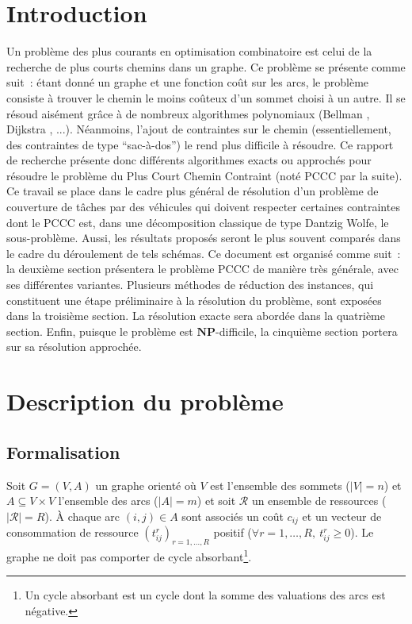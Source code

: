 \documentclass[10pt,francais]{llncs}
\begin{document}
\section{Introduction}\label{sec-intro}
Un probl\`eme des plus courants en optimisation combinatoire est celui de la recherche de plus courts chemins dans un graphe. Ce probl\`eme se pr\'esente comme suit~: \'etant donn\'e un graphe et une fonction co\^ut sur les arcs, le probl\`eme consiste \`a trouver le chemin le moins co\^uteux d'un sommet choisi \`a un autre. Il se r\'esoud ais\'ement gr\^ace \`a de nombreux algorithmes polynomiaux  (Bellman \cite{Bellman1958}, Dijkstra \cite{Dijkstra1959}, ...). N\'eanmoins, l'ajout de contraintes sur le chemin (essentiellement, des contraintes de type ``sac-\`a-dos'') le rend plus difficile \`a r\'esoudre. Ce rapport de recherche pr\'esente donc diff\'erents algorithmes exacts ou approch\'es pour r\'esoudre le probl\`eme du Plus Court Chemin Contraint (not\'e PCCC par la suite). Ce travail se place dans le cadre plus g\'en\'eral de r\'esolution d'un probl\`eme de couverture de t\^aches par des v\'ehicules qui doivent respecter certaines contraintes dont le PCCC est, dans une d\'ecomposition classique  de type Dantzig Wolfe, le sous-probl\`eme. Aussi, les r\'esultats propos\'es seront le plus souvent compar\'es dans le cadre du d\'eroulement de tels sch\'emas. 
Ce document est organis\'e comme suit~: la deuxi\`eme section pr\'esentera le probl\`eme PCCC de mani\`ere tr\`es g\'en\'erale, avec ses diff\'erentes variantes. Plusieurs m\'ethodes de r\'eduction des instances, qui constituent une \'etape pr\'eliminaire \`a la r\'esolution du probl\`eme, sont expos\'ees dans la troisi\`eme section. La r\'esolution exacte sera abord\'ee dans la quatri\`eme section. Enfin, puisque le probl\`eme est $\mathbf{NP}$-difficile, la cinqui\`eme section portera sur sa r\'esolution approch\'ee.

\section{Description du probl\`eme}\label{sec-desc}
\subsection{Formalisation}\label{sub-desc-form} 
Soit $G=(V,A)$ un graphe orient\'e o\`u $V$ est l'ensemble des sommets ($|V| = n$) et $A \subseteq V \times V$ l'ensemble des arcs ($|A| = m$) et soit $\mathscr{R}$ un ensemble de ressources ($|\mathscr{R}| =R$). \`A chaque arc $(i,j)\in A$ sont associ\'es un co\^ut $c_{ij}$ et un vecteur de consommation de ressource $(t^r_{ij})_{r=1,\ldots,R}$ positif ($\forall r=1,\ldots,R,\ t^r_{ij} \geq 0$). Le graphe ne doit pas comporter de cycle absorbant\footnote{Un cycle absorbant est un cycle dont la somme des valuations des arcs est n\'egative.}.\\
\end{document}
